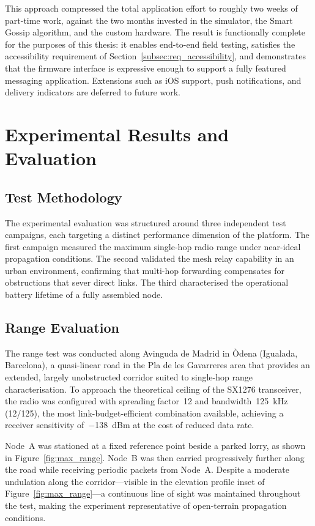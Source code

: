 \documentclass[english,bachelor]{tfgitic}[2026/01/22]
\begin{document}
This approach compressed the total application effort to roughly two weeks of part-time work, against the two months invested in the simulator, the Smart Gossip algorithm, and the custom hardware. The result is functionally complete for the purposes of this thesis: it enables end-to-end field testing, satisfies the accessibility requirement of Section~\ref{subsec:req_accessibility}, and demonstrates that the firmware  interface is expressive enough to support a fully featured messaging application. Extensions such as iOS support, push notifications, and delivery indicators are deferred to future work.

\section{Experimental Results and Evaluation}
\label{ch:results}

\subsection{Test Methodology}

The experimental evaluation was structured around three independent test campaigns, each targeting a distinct performance dimension of the platform. The first campaign measured the maximum single-hop radio range under near-ideal propagation conditions. The second validated the mesh relay capability in an urban environment, confirming that multi-hop forwarding compensates for obstructions that sever direct links. The third characterised the operational battery lifetime of a fully assembled node.
\subsection{Range Evaluation}

The range test was conducted along Avinguda de Madrid in Òdena (Igualada, Barcelona), a quasi-linear road in the Pla de les Gavarreres area that provides an extended, largely unobstructed corridor suited to single-hop range characterisation. To approach the theoretical ceiling of the SX1276 transceiver, the radio was configured with spreading factor~12 and bandwidth~125~kHz (12/125), the most link-budget-efficient combination available, achieving a receiver sensitivity of~$-$138~dBm at the cost of reduced data rate.

Node~A was stationed at a fixed reference point beside a parked lorry, as shown in Figure~\ref{fig:max_range}. Node~B was then carried progressively further along the road while receiving periodic packets from Node~A. Despite a moderate undulation along the corridor---visible in the elevation profile inset of Figure~\ref{fig:max_range}---a continuous line of sight was maintained throughout the test, making the experiment representative of open-terrain propagation conditions.
\end{document}
